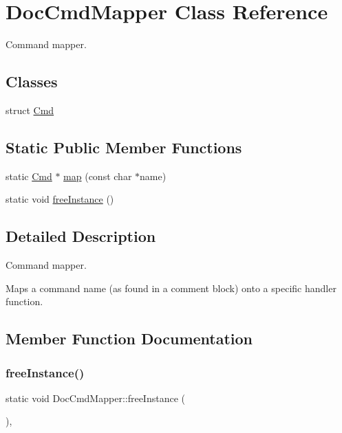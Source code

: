 \hypertarget{class_doc_cmd_mapper}{}\section{Doc\+Cmd\+Mapper Class Reference}
\label{class_doc_cmd_mapper}


Command mapper.  


\subsection*{Classes}
\begin{DoxyCompactItemize}
\item 
struct \mbox{\hyperlink{struct_doc_cmd_mapper_1_1_cmd}{Cmd}}
\end{DoxyCompactItemize}
\subsection*{Static Public Member Functions}
\begin{DoxyCompactItemize}
\item 
static \mbox{\hyperlink{struct_doc_cmd_mapper_1_1_cmd}{Cmd}} $\ast$ \mbox{\hyperlink{class_doc_cmd_mapper_a983c735e46e800262105205573abfbbb}{map}} (const char $\ast$name)
\item 
static void \mbox{\hyperlink{class_doc_cmd_mapper_a69bde26113801d862644d4afe5c09ff6}{free\+Instance}} ()
\end{DoxyCompactItemize}


\subsection{Detailed Description}
Command mapper. 

Maps a command name (as found in a comment block) onto a specific handler function. 

\subsection{Member Function Documentation}
\mbox{\label{class_doc_cmd_mapper_a69bde26113801d862644d4afe5c09ff6}} 
\subsubsection{\texorpdfstring{freeInstance()}{freeInstance()}}
{\footnotesize\ttfamily static void Doc\+Cmd\+Mapper\+::free\+Instance (\begin{DoxyParamCaption}{ }\end{DoxyParamCaption})\hspace{0.3cm}{\ttfamily [inline]}, {\ttfamily [static]}}

